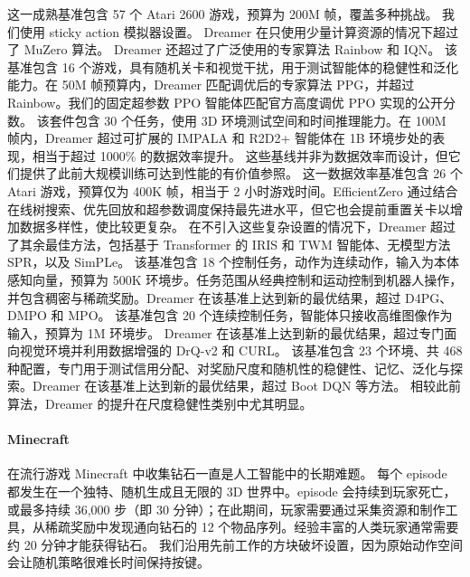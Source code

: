\begin{itemize}
 这一成熟基准包含 57 个 Atari 2600 游戏，预算为 200M 帧，覆盖多种挑战\citep{bellemare2013ale}。
我们使用 sticky action 模拟器设置\citep{machado2018revisiting}。
Dreamer 在只使用少量计算资源的情况下超过了 MuZero 算法\citep{schrittwieser2019muzero}。
Dreamer 还超过了广泛使用的专家算法 Rainbow\citep{hessel2018rainbow} 和 IQN\citep{dabney2018iqn}。
 该基准包含 16 个游戏，具有随机关卡和视觉干扰，用于测试智能体的稳健性和泛化能力\citep{cobbe2020procgen}。在 50M 帧预算内，Dreamer 匹配调优后的专家算法 PPG\citep{cobbe2021ppg}，并超过 Rainbow\citep{cobbe2020procgen,hessel2018rainbow}。我们的固定超参数 PPO 智能体匹配官方高度调优 PPO 实现的公开分数\citep{cobbe2021ppg}。
 该套件包含 30 个任务，使用 3D 环境测试空间和时间推理能力\citep{beattie2016dmlab}。在 100M 帧内，Dreamer 超过可扩展的 IMPALA 和 R2D2+ 智能体在 1B 环境步处的表现\citep{kapturowski2018r2d2}，相当于超过 1000\% 的数据效率提升。
这些基线并非为数据效率而设计，但它们提供了此前大规模训练可达到性能的有价值参照。
 这一数据效率基准包含 26 个 Atari 游戏，预算仅为 400K 帧，相当于 2 小时游戏时间\citep{kaiser2019simple}。EfficientZero\citep{ye2021effzero} 通过结合在线树搜索、优先回放和超参数调度保持最先进水平，但它也会提前重置关卡以增加数据多样性，使比较更复杂。
在不引入这些复杂设置的情况下，Dreamer 超过了其余最佳方法，包括基于 Transformer 的 IRIS 和 TWM 智能体、无模型方法 SPR，以及 SimPLe\citep{micheli2022iris}。
 该基准包含 18 个控制任务，动作为连续动作，输入为本体感知向量，预算为 500K 环境步\citep{tassa2018dmcontrol}。任务范围从经典控制和运动控制到机器人操作，并包含稠密与稀疏奖励。Dreamer 在该基准上达到新的最优结果，超过 D4PG、DMPO 和 MPO\citep{abdolmaleki2018mpo}。
 该基准包含 20 个连续控制任务，智能体只接收高维图像作为输入，预算为 1M 环境步\citep{tassa2018dmcontrol}。
Dreamer 在该基准上达到新的最优结果，超过专门面向视觉环境并利用数据增强的 DrQ-v2 和 CURL\citep{yarats2021drqv2}。
\pagebreak
{} 该基准包含 23 个环境、共 468 种配置，专门用于测试信用分配、对奖励尺度和随机性的稳健性、记忆、泛化与探索\citep{osband2019bsuite}。Dreamer 在该基准上达到新的最优结果，超过 Boot DQN 等方法\citep{dizon2023bsuiteagents}。
相较此前算法，Dreamer 的提升在尺度稳健性类别中尤其明显。
\end{itemize}

\paragraph{Minecraft}
在流行游戏 Minecraft 中收集钻石一直是人工智能中的长期难题\citep{guss2019minerl,kanitscheider2021minecraftcurriculum,baker2022vpt}。
每个 episode 都发生在一个独特、随机生成且无限的 3D 世界中。episode 会持续到玩家死亡，或最多持续 36,000 步（即 30 分钟）；在此期间，玩家需要通过采集资源和制作工具，从稀疏奖励中发现通向钻石的 12 个物品序列。经验丰富的人类玩家通常需要约 20 分钟才能获得钻石\citep{baker2022vpt}。
我们沿用先前工作的方块破坏设置\citep{kanitscheider2021minecraftcurriculum}，因为原始动作空间会让随机策略很难长时间保持按键。


